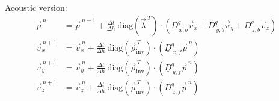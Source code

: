\documentclass[pdftex,a4paper,parskip,listof=totoc,bibliography=totoc,onehalfspacing,12pt]{scrreprt}
\begin{document}
\newpage

Acoustic version:
\begin{align*}
	\vec{p}^{\,n} &= \vec{p}^{\,n-1} + \frac{\Delta t}{\Delta h}~ \mathrm{diag} \left( \vec{\lambda}^{\,T} \right) \cdot \left( \underline{D}_{\,x,b}^q \vec{v}_x +\underline{D}_{\,y,b}^q \vec{v}_y + \underline{D}_{\,z,b}^q \vec{v}_z \right) \\
	\vec{v}_x^{\,n+1} &= \vec{v}_x^{\,n} + \frac{\Delta t}{\Delta h} ~ \mathrm{diag} \left( \vec{\rho}_\mathrm{inv}^{\,T} \right) \cdot \left( \underline{D}_{\,x,f}^q \vec{p}^{\,n}  \right)\\
	\vec{v}_y^{\,n+1} &= \vec{v}_y^{\,n} + \frac{\Delta t}{\Delta h} ~ \mathrm{diag} \left( \vec{\rho}_\mathrm{inv}^{\,T} \right) \cdot \left( \underline{D}_{\,y,f}^q \vec{p}^{\,n} \right)\\
	\vec{v}_z^{\,n+1} &= \vec{v}_z^{\,n} + \frac{\Delta t}{\Delta h} ~ \mathrm{diag}  \left( \vec{\rho}_\mathrm{inv}^{\,T} \right) \cdot\left( \underline{D}_{\,z,f}^q \vec{p}^{\,n} \right)\\
\end{align*}

\cleardoublepage


\end{document}
